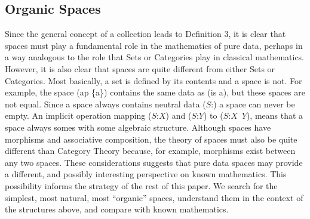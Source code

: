 \documentclass[11pt]{article}
\begin{document}
\subsection{Organic Spaces}

   Since the general concept of a collection leads to Definition 3, it is clear that spaces must play a fundamental role 
in the mathematics of pure data, perhaps in a way analogous to the role that Sets or Categories play in classical mathematics. However, it is also 
clear that spaces are quite different from either Sets or Categories.  Most basically, a set is defined by its contents and a space is not.  For example,
the space (ap \{a\}) contains the same data as (is a), but these spaces are not equal.    
Since a space always contains neutral data ($S$:) a space can never be empty.  An implicit operation mapping 
($S$:$X$) and ($S$:$Y$) to ($S$:$X$\ $Y$), means that a space always somes with some algebraic structure.  
Although spaces have morphisms and associative composition, the theory of spaces must also be quite different than Category Theory because, for example, morphisms exist 
between any two spaces.  
These considerations suggests that pure data spaces may provide a different, and possibly interesting perspective on known mathematics.  
This possibility informs the strategy of the rest of this paper.  We 
search for the simplest, most natural, most ``organic'' spaces, understand them in the context of the structures above, and compare with known mathematics.  
\end{document}
